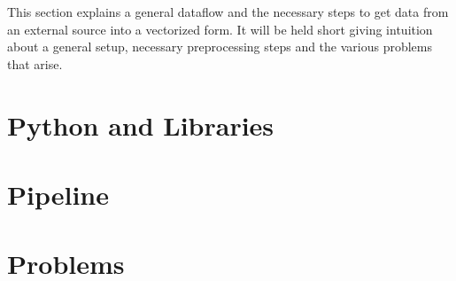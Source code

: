 
This section explains a general dataflow and the necessary steps to get data from an external source into a vectorized form. It will be held short giving intuition about a general setup, necessary preprocessing steps and the various problems that arise.

\section{Python and Libraries}
\section{Pipeline}
\section{Problems}